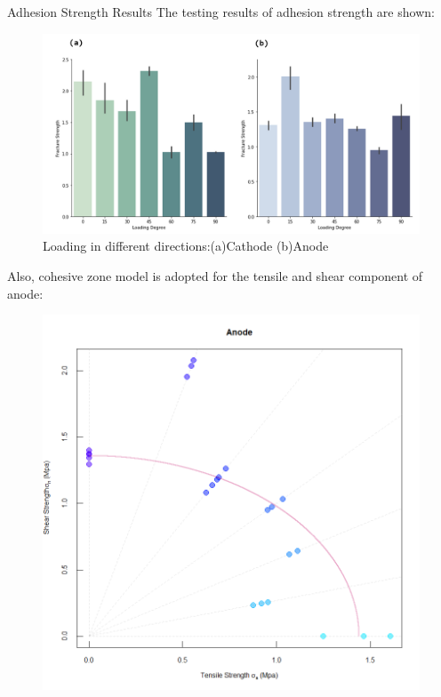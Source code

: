\documentclass[final]{beamer}
\newlength{\onecolwid}
\newlength{\twocolwid}
\begin{document}
\begin{frame}[t]
\begin{columns}[t]
\begin{column}{\twocolwid}
\begin{columns}[t,totalwidth=\twocolwid]
\begin{column}{\onecolwid}
\begin{block}{Adhesion Strength Results}
The testing results of adhesion strength are shown:
\begin{figure}
\includegraphics[width=\linewidth]{Strength.png}
\caption{Loading in different directions:(a)Cathode (b)Anode}
\end{figure}
Also, cohesive zone model is adopted for the tensile and shear component of anode:
\begin{figure}
\includegraphics[width=0.8\linewidth]{circle.png}
\end{figure}


\end{block}


\end{column} %


\end{columns}
\end{column}
\end{columns}
\end{frame}
\end{document}
